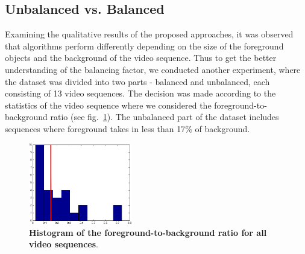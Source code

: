 \subsection{Unbalanced vs. Balanced}
Examining the qualitative results of the proposed approaches, it was observed that algorithms perform differently depending on the size of the foreground objects and the background of the video sequence. Thus to get the 
better understanding
of the balancing factor, we conducted another experiment, where the dataset was divided into two parts - balanced and unbalanced, each consisting of 13 video sequences.
The decision was made according to the statistics of the video sequence where we considered the foreground-to-background ratio (see fig.~\ref{fig:hist}). The unbalanced part of the dataset includes
sequences where foreground takes in less than 17\% of background.
\begin{figure}[!h]
\centering
\includegraphics[width=0.4\textwidth]{images/1.png}
\caption[Histogram of the foreground-to-background ratio for all video sequences]{
{\bf Histogram of the foreground-to-background ratio for all video sequences}.}
\label{fig:hist}
\end{figure}

